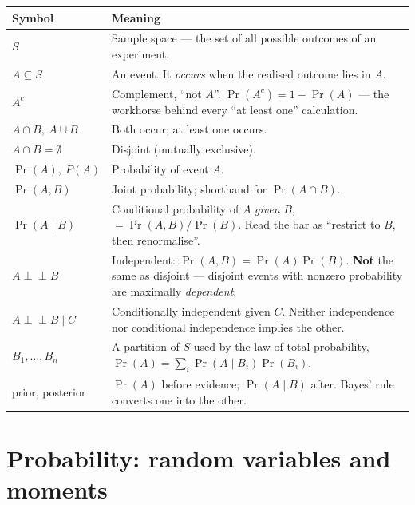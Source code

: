 \documentclass[10pt,letterpaper,onecolumn]{article}
\makeatletter
\newenvironment{symtab}
  {\begin{longtable}{@{}>{\raggedright\arraybackslash}p{0.26\textwidth}%
                       >{\raggedright\arraybackslash}p{0.70\textwidth}@{}}
   \toprule
   \textbf{Symbol} & \textbf{Meaning} \\
   \midrule
   \endhead
   \bottomrule
   \endfoot}
  {\end{longtable}}
\newcommand{\indep}{\perp\!\!\!\perp}
\makeatother
\begin{document}
\begin{symtab}
$S$ & Sample space — the set of all possible outcomes of an experiment. \\
$A \subseteq S$ & An event. It \emph{occurs} when the realised outcome lies in $A$. \\
$A^{c}$ & Complement, ``not $A$''. $\Pr(A^c) = 1-\Pr(A)$ — the workhorse behind every ``at least one'' calculation. \\
$A \cap B,\ A \cup B$ & Both occur; at least one occurs. \\
$A \cap B = \emptyset$ & Disjoint (mutually exclusive). \\
$\Pr(A),\ P(A)$ & Probability of event $A$. \\
$\Pr(A, B)$ & Joint probability; shorthand for $\Pr(A \cap B)$. \\
$\Pr(A \mid B)$ & Conditional probability of $A$ \emph{given} $B$, $= \Pr(A,B)/\Pr(B)$. Read the bar as ``restrict to $B$, then renormalise''. \\
$A \indep B$ & Independent: $\Pr(A,B) = \Pr(A)\Pr(B)$. \textbf{Not} the same as disjoint — disjoint events with nonzero probability are maximally \emph{dependent}. \\
$A \indep B \mid C$ & Conditionally independent given $C$. Neither independence nor conditional independence implies the other. \\
$B_1,\dots,B_n$ & A partition of $S$ used by the law of total probability, $\Pr(A) = \sum_i \Pr(A \mid B_i)\Pr(B_i)$. \\
prior, posterior & $\Pr(A)$ before evidence; $\Pr(A \mid B)$ after. Bayes' rule converts one into the other. \\
\end{symtab}

\section{Probability: random variables and moments}
\label{sec:rvs}
\end{document}
